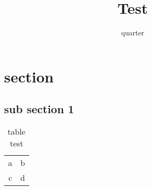 \documentclass[a4paper]{bxjsarticle}
\title{Test}
\author{quarter}
\begin{document}
\maketitle
\section{section}
\subsection{sub section 1}
\begin{table}[htbp]
  \centering
  \caption{table test}
  \label{table}
  \begin{tabular}{cc}
    a & b \\
    c & d 
  \end{tabular}
\end{table}
\end{document}
